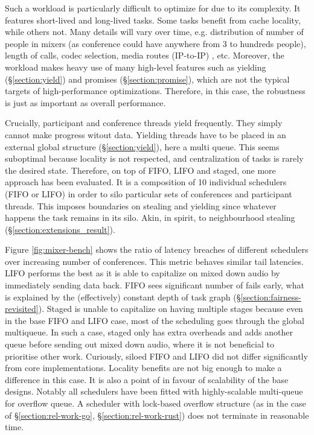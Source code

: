 \documentclass[12pt,a4paper,twoside]{report}
\begin{document}
Such a workload is particularly difficult to optimize for due to its complexity. It features short-lived and long-lived tasks. Some tasks benefit from cache locality, while others not. Many details will vary over time, e.g. distribution of number of people in mixers (as conference could have anywhere from 3 to hundreds people), length of calls, codec selection, media routes (IP-to-IP) \cite{Frequent1:online}, etc. Moreover, the workload makes heavy use of many high-level features such as yielding (\S\ref{section:yield}) and promises (\S\ref{section:promise}), which are not the typical targets of high-performance optimizations. Therefore, in this case, the robustness is just as important as overall performance. 
 
Crucially, participant and conference threads yield frequently. They simply cannot make progress witout data. Yielding threads have to be placed in an external global structure (\S\ref{section:yield}), here a multi queue. This seems suboptimal because locality is not respected, and centralization of tasks is rarely the desired state. Therefore, on top of FIFO, LIFO and staged, one more approach has been evaluated. It is a composition of 10 individual schedulers (FIFO or LIFO) in order to silo particular sets of conferences and participant threads. This imposes boundaries on stealing and yielding since whatever happens the task remains in its silo. Akin, in spirit, to neighbourhood stealing (\S\ref{section:extensions_result}).

\label{paragraph:overflow-queue-bad-2}

Figure \ref{fig:mixer-bench} shows the ratio of latency breaches of different schedulers over increasing number of conferences. This metric behaves similar tail latencies. LIFO performs the best as it is able to capitalize on mixed down audio by immediately sending data back. FIFO sees significant number of fails early, what is explained by the (effectively) constant depth of task graph (\S\ref{section:fairness-revisited}). Staged is unable to capitalize on having multiple stages because even in the base FIFO and LIFO case, most of the scheduling goes through the global multiqueue. In such a case, staged only has extra overheads and adds another queue before sending out mixed down audio, where it is not beneficial to prioritise other work. Curiously, siloed FIFO and LIFO did not differ significantly from core implementations. Locality benefits are not big enough to make a difference in this case. It is also a point of in favour of scalability of the base designs. Notably all schedulers have been fitted with highly-scalable multi-queue for overflow queue. A scheduler with lock-based overflow structure (as in the case of \S\ref{section:rel-work-go}, \S\ref{section:rel-work-rust}) does not terminate in reasonable time.
\end{document}
